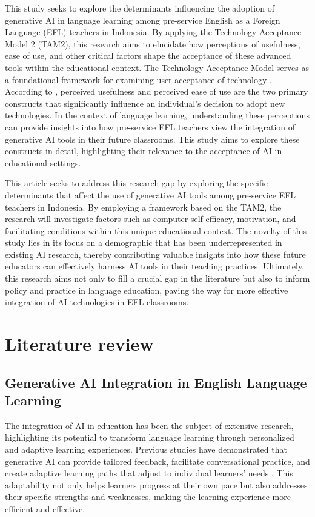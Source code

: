 \documentclass[english]{textolivre}
\begin{document}
This study seeks to explore the determinants influencing the adoption of generative AI in language learning among pre-service English as a Foreign Language (EFL) teachers in Indonesia. By applying the Technology Acceptance Model 2 (TAM2), this research aims to elucidate how perceptions of usefulness, ease of use, and other critical factors shape the acceptance of these advanced tools within the educational context. The Technology Acceptance Model serves as a foundational framework for examining user acceptance of technology \cite{VenkateshDavis2000TAMExtension}. According to \textcite{Davis1989TAM}, perceived usefulness and perceived ease of use are the two primary constructs that significantly influence an individual’s decision to adopt new technologies. In the context of language learning, understanding these perceptions can provide insights into how pre-service EFL teachers view the integration of generative AI tools in their future classrooms. This study aims to explore these constructs in detail, highlighting their relevance to the acceptance of AI in educational settings.

This article seeks to address this research gap by exploring the specific determinants that affect the use of generative AI tools among pre-service EFL teachers in Indonesia. By employing a framework based on the TAM2, the research will investigate factors such as computer self-efficacy, motivation, and facilitating conditions within this unique educational context. The novelty of this study lies in its focus on a demographic that has been underrepresented in existing AI research, thereby contributing valuable insights into how these future educators can effectively harness AI tools in their teaching practices. Ultimately, this research aims not only to fill a crucial gap in the literature but also to inform policy and practice in language education, paving the way for more effective integration of AI technologies in EFL classrooms.

\section{Literature review}\label{sec-normas}

\subsection{Generative AI Integration in English Language Learning}
The integration of AI in education has been the subject of extensive research, highlighting its potential to transform language learning through personalized and adaptive learning experiences. Previous studies have demonstrated that generative AI can provide tailored feedback, facilitate conversational practice, and create adaptive learning paths that adjust to individual learners’ needs \cite{Tafazoli2024GenerativeAI}. This adaptability not only helps learners progress at their own pace but also addresses their specific strengths and weaknesses, making the learning experience more efficient and effective.
\end{document}
